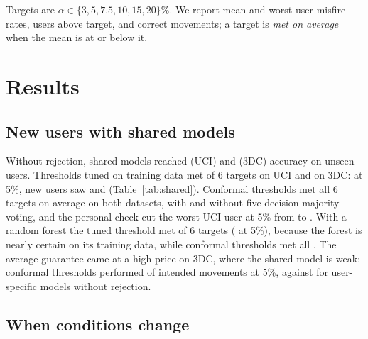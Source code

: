 \documentclass[conference]{IEEEtran}
\newcommand{\target}{\alpha}
\begin{document}
Targets are $\target\in\{3,5,7.5,10,15,20\}\%$. We report mean and worst-user misfire rates, users above target, and correct movements; a target is \emph{met on average} when the mean is at or below it.

\section{Results}

\subsection{New users with shared models}

\begin{table}[t]
\caption{Shared LDA models, unseen users: mean and worst misfire rate (\%), users above target, and correct movements (\%).}
\label{tab:shared}
\centering
\footnotesize
\setlength{\tabcolsep}{3pt}

\end{table}

Without rejection, shared models reached \accUci{} (UCI) and \accTdc{} (3DC) accuracy on unseen users. Thresholds tuned on training data met \tunedKeptUci{} of 6 targets on UCI and \tunedKeptTdc{} on 3DC: at 5\%, new users saw \tunedFiveUci{} and \tunedFiveTdc{} (Table~\ref{tab:shared}). Conformal thresholds met all 6 targets on average on both datasets, with and without five-decision majority voting, and the personal check cut the worst UCI user at 5\% from \worstConfUci{} to \worstConfPersUci{}. With a random forest the tuned threshold met \rfKeptTuned{} of 6 targets (\rfTunedFive{} at 5\%), because the forest is nearly certain on its training data, while conformal thresholds met all \rfKeptConf{}. The average guarantee came at a high price on 3DC, where the shared model is weak: conformal thresholds performed \confFiveMovesTdc{} of intended movements at 5\%, against \ownMovesTdc{} for user-specific models without rejection.

\subsection{When conditions change}

\begin{table}[t]
\caption{User-specific LDA models after a change, 5\% target (fixed and ROC thresholds have no target). Mean and worst-user misfire rate and correct movements (\%). Number of people in parentheses.}
\label{tab:drift}
\centering
\footnotesize
\setlength{\tabcolsep}{4.2pt}

\end{table}
\end{document}
